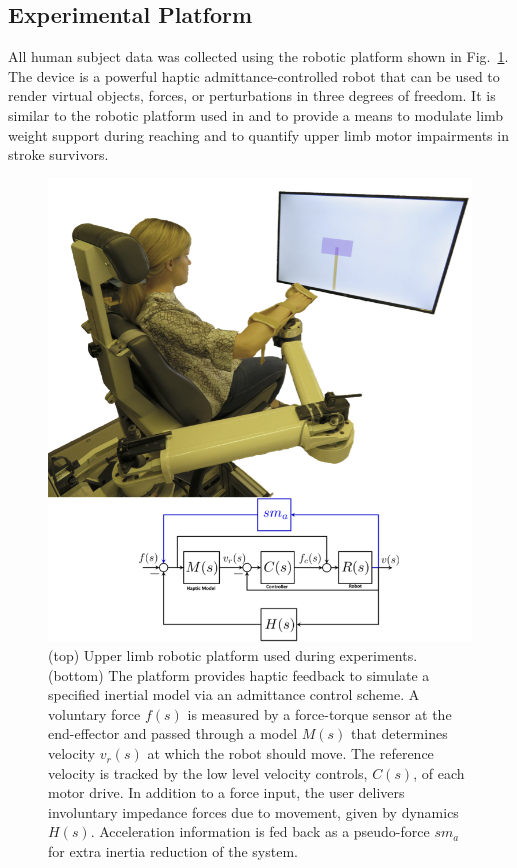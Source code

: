 \subsection{Experimental Platform}

All human subject data was collected using the robotic platform shown in Fig.~\ref{nact3d}. The device is a powerful haptic admittance-controlled robot that can be used to render virtual objects, forces, or perturbations in three degrees of freedom. It is similar to the robotic platform used in \cite{ellis2016} and \cite{stienen2011} to provide a means to modulate limb weight support during reaching and to quantify upper limb motor impairments in stroke survivors.

\begin{figure}[h]
\centering
\includegraphics[width=0.7\columnwidth]{NACT-userview-small.png}
\caption{(top) Upper limb robotic platform used during experiments. (bottom) The platform provides haptic feedback to simulate a specified inertial model via an admittance control scheme. A voluntary force $f(s)$ is measured by a force-torque sensor at the end-effector and passed through a model $M(s)$ that determines velocity $v_r(s)$ at which the robot should move. The reference velocity is tracked by the low level velocity controls, $C(s)$, of each motor drive. In addition to a force input, the user delivers involuntary impedance forces due to movement, given by dynamics $H(s)$. Acceleration information is fed back as a pseudo-force $sm_a$ for extra inertia reduction of the system.}
\label{nact3d}
\end{figure}


